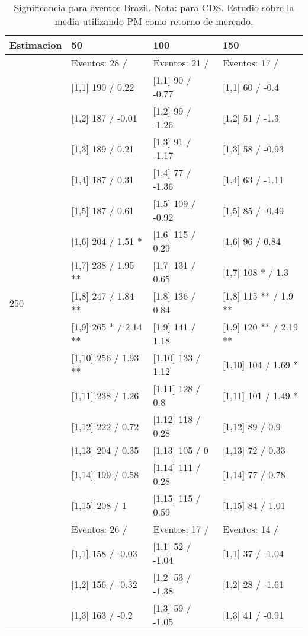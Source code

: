 \begin{table}

\caption{Significancia para eventos Brazil. Nota: para CDS. Estudio sobre la media utilizando PM como retorno de mercado.}
\centering
\begin{tabular}[t]{llll}
\toprule
Estimacion & 50 & 100 & 150\\
\midrule
 & Eventos:  28 / & Eventos:  21 / & Eventos:  17 /\\
 & {}[1,1] 190  / 0.22 & {}[1,1] 90  / -0.77 & {}[1,1] 60  / -0.4\\
 & {}[1,2] 187  / -0.01 & {}[1,2] 99  / -1.26 & {}[1,2] 51  / -1.3\\
 & {}[1,3] 189  / 0.21 & {}[1,3] 91  / -1.17 & {}[1,3] 58  / -0.93\\
 & {}[1,4] 187  / 0.31 & {}[1,4] 77  / -1.36 & {}[1,4] 63  / -1.11\\
\addlinespace
 & {}[1,5] 187  / 0.61 & {}[1,5] 109  / -0.92 & {}[1,5] 85  / -0.49\\
 & {}[1,6] 204  / 1.51 * & {}[1,6] 115  / 0.29 & {}[1,6] 96  / 0.84\\
 & {}[1,7] 238  / 1.95 ** & {}[1,7] 131  / 0.65 & {}[1,7] 108 * / 1.3\\
250 & {}[1,8] 247  / 1.84 ** & {}[1,8] 136  / 0.84 & {}[1,8] 115 ** / 1.9 **\\
 & {}[1,9] 265 * / 2.14 ** & {}[1,9] 141  / 1.18 & {}[1,9] 120 ** / 2.19 **\\
\addlinespace
 & {}[1,10] 256  / 1.93 ** & {}[1,10] 133  / 1.12 & {}[1,10] 104  / 1.69 *\\
 & {}[1,11] 238  / 1.26 & {}[1,11] 128  / 0.8 & {}[1,11] 101  / 1.49 *\\
 & {}[1,12] 222  / 0.72 & {}[1,12] 118  / 0.28 & {}[1,12] 89  / 0.9\\
 & {}[1,13] 204  / 0.35 & {}[1,13] 105  / 0 & {}[1,13] 72  / 0.33\\
 & {}[1,14] 199  / 0.58 & {}[1,14] 111  / 0.28 & {}[1,14] 77  / 0.78\\
\addlinespace
 & {}[1,15] 208  / 1 & {}[1,15] 115  / 0.59 & {}[1,15] 84  / 1.01\\
 & Eventos:  26 / & Eventos:  17 / & Eventos:  14 /\\
 & {}[1,1] 158  / -0.03 & {}[1,1] 52  / -1.04 & {}[1,1] 37  / -1.04\\
 & {}[1,2] 156  / -0.32 & {}[1,2] 53  / -1.38 & {}[1,2] 28  / -1.61\\
 & {}[1,3] 163  / -0.2 & {}[1,3] 59  / -1.05 & {}[1,3] 41  / -0.91\\

\end{tabular}
\end{table}
